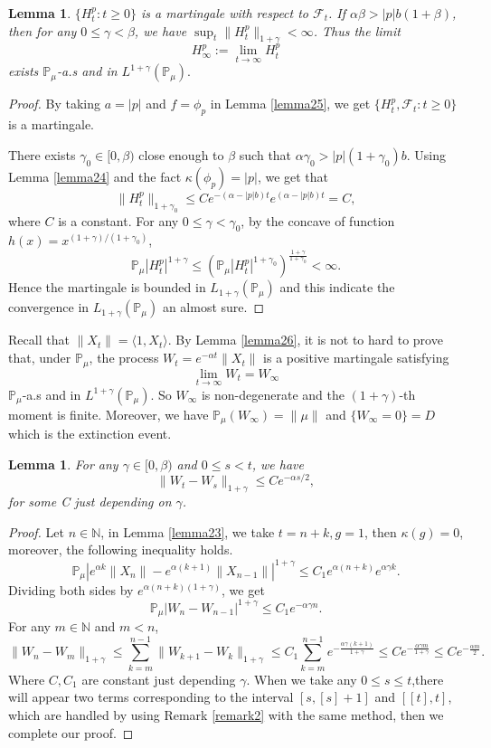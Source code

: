 \documentclass[12pt, a4paper]{amsart}
\newtheorem{lem}[thm]{Lemma}
\theoremstyle{definition}
\numberwithin{equation}{section}
\begin{document}
\begin{lem}\label{lemma26}
$\{H_t^p: t\geq0\}$ is a martingale with respect to $\mathcal{F}_t$. If $\alpha\beta>|p|b(1+\beta)$, then for any $0\leq \gamma<\beta$, we have $\sup_t\|H_t^p\|_{1+\gamma}< \infty$. Thus the limit
$$H_{\infty}^p:=\lim_{t\rightarrow \infty}H_t^p$$
exists $\mathbb{P}_{\mu}$-a.s and in $L^{1+\gamma}(\mathbb{P}_{\mu}).$
\end{lem}
\begin{proof}
    By taking $a=|p|$ and $f=\phi_p$ in Lemma \ref{lemma25}, we get $\{H_t^p, \mathcal{F}_t:t\geq 0\}$ is a martingale.

    There exists $\gamma_0 \in [0,\beta)$ close enough to $\beta$ such that $\alpha\gamma_0>|p|(1+\gamma_0)b$. Using  Lemma \eqref{lemma24} and the fact $\kappa(\phi_p)=|p|$, we get that
    $$\|H_t^p\|_{1+\gamma_0}\leq Ce^{-(\alpha-|p|b)t}e^{(\alpha-|p|b)t}=C,$$
    where $C$ is a constant. For any $0\leq\gamma<\gamma_0$, by the concave of function $h(x)=x^{(1+\gamma)/(1+\gamma_0)}$, 
    $$\mathbb{P}_{\mu}|H_t^p|^{1+\gamma}\leq(\mathbb{P}_{\mu}|H_t^p|^{1+\gamma_0})^{\frac{1+\gamma}{1+\gamma_0}}<\infty.$$
    Hence the martingale is bounded in $L_{1+\gamma}(\mathbb{P}_{\mu})$ and this indicate the convergence in $L_{1+\gamma}(\mathbb{P}_{\mu}) $ an almost sure.
\end{proof}


Recall that $\|X_t\|=\langle 1,X_t\rangle$. By Lemma \eqref{lemma26}, it is not to hard to prove that, under $\mathbb{P}_{\mu}$, the process $W_t=e^{-\alpha t}\|X_t\|$ is a positive martingale satisfying
$$\lim_{t\rightarrow \infty} W_t= W_{\infty}$$
$\mathbb{P}_{\mu}$-a.s and in $L^{1+\gamma}(\mathbb{P}_{\mu})$. So $W_{\infty}$ is non-degenerate and the $(1+\gamma)$-th moment is finite. Moreover, we have $\mathbb{P}_{\mu}(W_{\infty})=\|\mu\|$ and $\{W_{\infty}=0\}=D$ which is the extinction event.
\begin{lem}\label{lemma27}
 For any $\gamma\in [0,\beta)$ and $0\leq s<t$, we have 
 $$\|W_t-W_s\|_{1+\gamma}\leq C e^{-\alpha s/2},$$
 for some C just depending on $\gamma$.
\end{lem}

\begin{proof}
    Let $n\in \mathbb{N}$, in Lemma \eqref{lemma23}, we take $t=n+k,g=1$, then $\kappa(g)=0$, moreover, the following inequality holds.
    $$ \mathbb{P}_{\mu}\left|e^{\alpha k}\|X_n\|-e^{\alpha(k+1)}\|X_{n-1}\|\right|^{1+\gamma}\leq C_1 e^{\alpha(n+k)}e^{\alpha\gamma k}.$$
    Dividing both sides by $e^{\alpha(n+k)(1+\gamma)}$, we get
    $$\mathbb{P}_{\mu}\left|W_n-W_{n-1}\right|^{1+\gamma}\leq C_1 e^{-\alpha \gamma n}.$$
    For any $m\in \mathbb{N}$ and $m<n$, 
    $$\|W_n-W_m\|_{1+\gamma}\leq \sum_{k=m}^{n-1}\|W_{k+1}-W_k\|_{1+\gamma}\leq C_1\sum_{k=m}^{n-1}e^{-\frac{\alpha\gamma(k+1)}{1+\gamma}}\leq C e^{-\frac{\alpha\gamma m}{1+\gamma}}\leq C e^{-\frac{\alpha m}{2}}.$$
    Where $C,C_1$ are constant just depending $\gamma$.
 When we take any $0\leq s\leq t$,there will appear two terms corresponding to the interval $[s,[s]+1]$ and $[[t],t]$, which are  handled by using Remark \ref{remark2} with the same method, then we complete our proof.
\end{proof}
\end{document}
